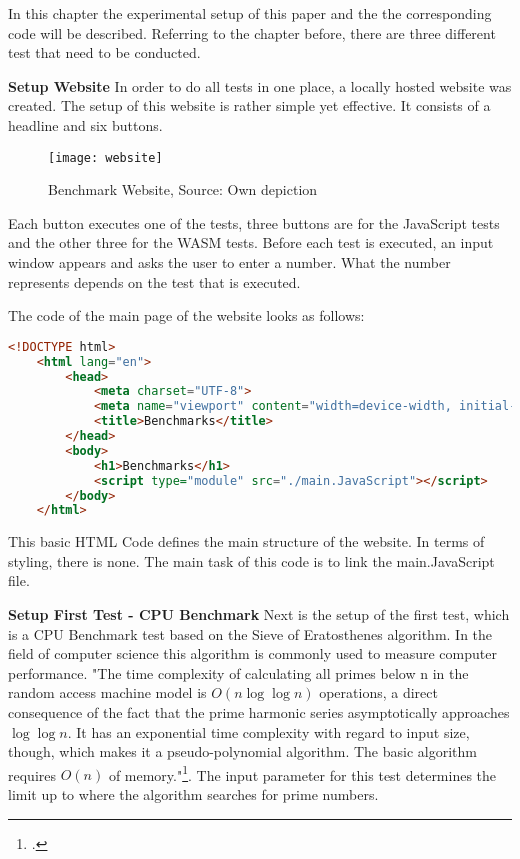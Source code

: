 In this chapter the experimental setup of this paper and the the corresponding code will be described. Referring to the chapter before, there are three different test that need to be conducted. 

\textbf{Setup Website} \newline
In order to do all tests in one place, a locally hosted website was created. The setup of this website is rather simple yet effective. It consists of a headline and six buttons.
\begin{figure}[H]
    \centering
    \texttt{[image: website]}
    \caption{Benchmark Website, Source: Own depiction}
	\label{fig:website}
\end{figure}

Each button executes one of the tests, three buttons are for the JavaScript tests and the other three for the WASM tests. Before each test is executed, an input window appears and asks the user to enter a number. What the number represents depends on the test that is executed.

The code of the main page of the website looks as follows:
\begin{lstlisting}[language=HTML, caption={HTML Code of the main page of the website, source: self-coded}]
    <!DOCTYPE html>
    <html lang="en">
        <head>
            <meta charset="UTF-8">
            <meta name="viewport" content="width=device-width, initial-scale=1.0">
            <title>Benchmarks</title>
        </head>
        <body>
            <h1>Benchmarks</h1>
            <script type="module" src="./main.JavaScript"></script>
        </body>
    </html>
\end{lstlisting}

This basic HTML Code defines the main structure of the website. In terms of styling, there is none. The main task of this code is to link the main.JavaScript file.  

\textbf{Setup First Test - CPU Benchmark} \newline
Next is the setup of the first test, which is a CPU Benchmark test based on the Sieve of Eratosthenes algorithm. In the field of computer science this algorithm is commonly used to measure computer performance. "The time complexity of calculating all primes below n in the random access machine model is \( O(n \log \log n) \) operations, a direct consequence of the fact that the prime harmonic series asymptotically approaches \( \log \log n\). It has an exponential time complexity with regard to input size, though, which makes it a pseudo-polynomial algorithm. The basic algorithm requires \( O(n) \) of memory."\footcite{wikipedia_sieve_2024}.
The input parameter for this test determines the limit up to where the algorithm searches for prime numbers.

